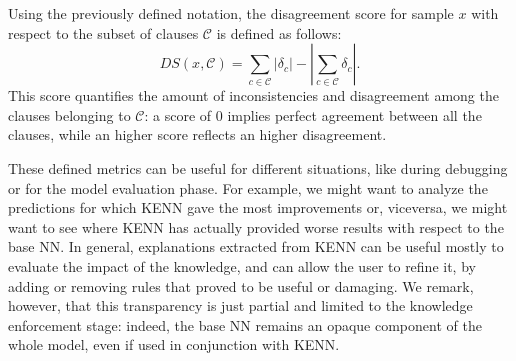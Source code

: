 \begin{definition}
	Using the previously defined notation, the disagreement score for sample $x$ with respect to the subset of clauses $\mathcal{C}$ is defined as follows:
	\begin{equation}
DS(x, \mathcal{C}) = \sum_{c\in\mathcal{C}}\left|\delta_c\right| - \left|\sum_{c\in\mathcal{C}}\delta_{c} \right|.
	\end{equation}
This score quantifies the amount of inconsistencies and disagreement among the clauses belonging to $\mathcal{C}$: a score of $0$ implies perfect agreement between all the clauses, while an higher score reflects an higher disagreement.
\end{definition}
These defined metrics can be useful for different situations, like during debugging or for the model evaluation phase. For example, we might want to analyze the predictions for which KENN gave the most improvements or, viceversa, we might want to see where KENN has actually provided worse results with respect to the base NN. 
In general, explanations extracted from KENN can be useful mostly to evaluate the impact of the knowledge, and can allow the user to refine it, by adding or removing rules that proved to be useful or damaging. We remark, however, that this transparency is just partial and limited to the knowledge enforcement stage: indeed, the base NN remains an opaque component of the whole model, even if used in conjunction with KENN.
 


